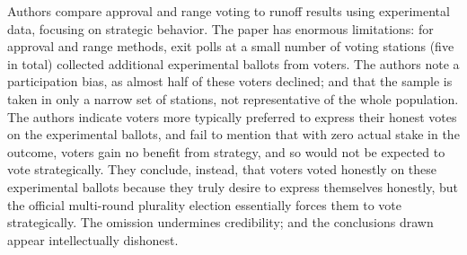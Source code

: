 Authors compare approval and range voting to runoff results using experimental data, focusing on strategic behavior.  The paper has enormous limitations:  for approval and range methods, exit polls at a small number of voting stations (five in total) collected additional experimental ballots from voters.  The authors note a participation bias, as almost half of these voters declined; and that the sample is taken in only a narrow set of stations, not representative of the whole population.  The authors indicate voters more typically preferred to express their honest votes on the experimental ballots, and fail to mention that with zero actual stake in the outcome, voters gain no benefit from strategy, and so would not be expected to vote strategically.  They conclude, instead, that voters voted honestly on these experimental ballots because they truly desire to express themselves honestly, but the official multi-round plurality election essentially forces them to vote strategically.  The omission undermines credibility; and the conclusions drawn appear intellectually dishonest.
